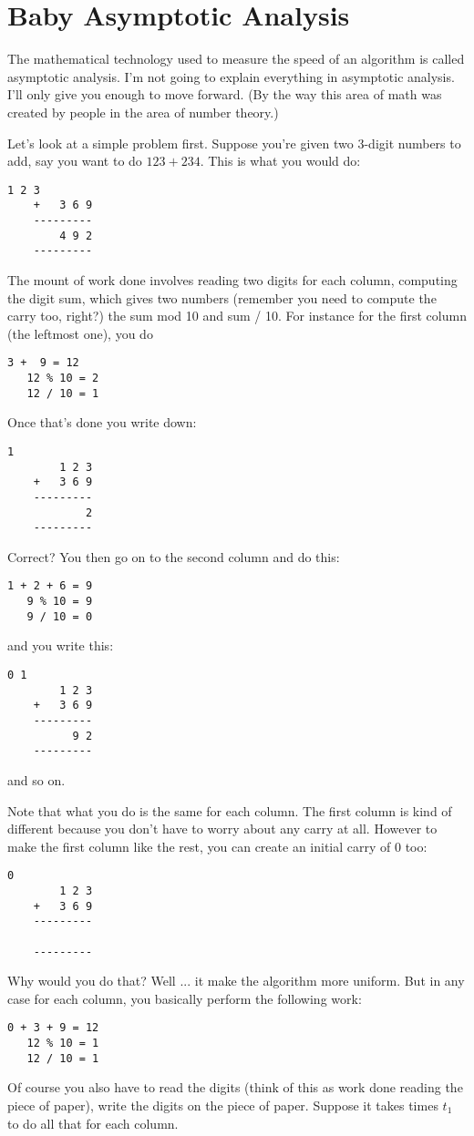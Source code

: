 \section{Baby Asymptotic Analysis}

The mathematical technology used to measure the speed of an algorithm is
called asymptotic analysis.
I'm not going to explain everything in asymptotic analysis.
I'll only give you enough to move forward.
(By the way this area of math was created by people in the area of
number theory.)

Let's look at a simple problem first.
Suppose you're given two 3-digit numbers to add, say you want to do
$123 + 234$.
This is what you would do:
\begin{Verbatim}[frame=single]
        1 2 3
    +   3 6 9
    ---------
        4 9 2 
    ---------
\end{Verbatim}
The mount of work done involves reading two digits for each column,
computing the digit sum, which gives two numbers (remember you need to
compute the carry too, right?) the sum mod 10 and sum / 10.
For instance for the first column (the leftmost one), you do
\begin{Verbatim}[frame=single]
    3 +  9 = 12
   12 % 10 = 2
   12 / 10 = 1
\end{Verbatim}
Once that's done you write down:
\begin{Verbatim}[frame=single]
          1
        1 2 3
    +   3 6 9
    ---------
            2 
    ---------
\end{Verbatim}
Correct? You then go on to the second column and do this:
\begin{Verbatim}[frame=single]
   1 + 2 + 6 = 9
   9 % 10 = 9
   9 / 10 = 0
\end{Verbatim}
and you write this:
\begin{Verbatim}[frame=single]
        0 1
        1 2 3
    +   3 6 9
    ---------
          9 2 
    ---------
\end{Verbatim}
and so on.

Note that what you do is the same for each column.
The first column is kind of different because you don't have 
to worry about any carry at all.
However to make the first column like the rest, you can create an
initial carry of 0 too:
\begin{Verbatim}[frame=single]
            0
        1 2 3
    +   3 6 9
    ---------
       
    ---------
\end{Verbatim}
Why would you do that?
Well ... it make the algorithm more uniform.
But in any case for each column, you basically perform the following
work:
\begin{Verbatim}[frame=single]
   0 + 3 + 9 = 12
   12 % 10 = 1
   12 / 10 = 1
\end{Verbatim}
Of course you also have to read the digits
(think of this as work done reading the piece of paper), 
write the digits on the piece of paper.
Suppose it takes times $t_1$ to do all that for each column.

